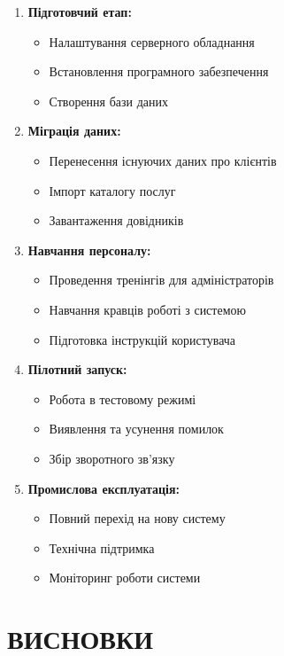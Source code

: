 \documentclass[14pt,a4paper]{extarticle}
\begin{document}
\begin{enumerate}
    \item \textbf{Підготовчий етап:}
    \begin{itemize}
        \item Налаштування серверного обладнання
        \item Встановлення програмного забезпечення
        \item Створення бази даних
    \end{itemize}
    
    \item \textbf{Міграція даних:}
    \begin{itemize}
        \item Перенесення існуючих даних про клієнтів
        \item Імпорт каталогу послуг
        \item Завантаження довідників
    \end{itemize}
    
    \item \textbf{Навчання персоналу:}
    \begin{itemize}
        \item Проведення тренінгів для адміністраторів
        \item Навчання кравців роботі з системою
        \item Підготовка інструкцій користувача
    \end{itemize}
    
    \item \textbf{Пілотний запуск:}
    \begin{itemize}
        \item Робота в тестовому режимі
        \item Виявлення та усунення помилок
        \item Збір зворотного зв'язку
    \end{itemize}
    
    \item \textbf{Промислова експлуатація:}
    \begin{itemize}
        \item Повний перехід на нову систему
        \item Технічна підтримка
        \item Моніторинг роботи системи
    \end{itemize}
\end{enumerate}

\newpage
\section{ВИСНОВКИ}
\end{document}
